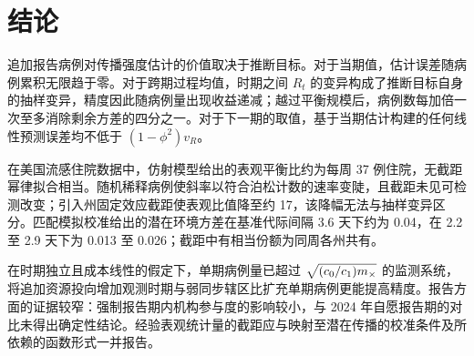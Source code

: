 \section{结论}
\label{sec:conclusion}

追加报告病例对传播强度估计的价值取决于推断目标。对于当期值，估计误差随病例累积无限趋于零。对于跨期过程均值，时期之间 $R_t$ 的变异构成了推断目标自身的抽样变异，精度因此随病例量出现收益递减；越过平衡规模后，病例数每加倍一次至多消除剩余方差的四分之一。对于下一期的取值，基于当期估计构建的任何线性预测误差均不低于 $(1-\phi^2)v_R$。

在美国流感住院数据中，仿射模型给出的表观平衡比约为每周 37 例住院，无截距幂律拟合相当。随机稀释病例使斜率以符合泊松计数的速率变陡，且截距未见可检测改变；引入州固定效应截距使表观比值降至约 17，该降幅无法与抽样变异区分。匹配模拟校准给出的潜在环境方差在基准代际间隔 3.6 天下约为 0.04，在 2.2 至 2.9 天下为 0.013 至 0.026；截距中有相当份额为同周各州共有。

在时期独立且成本线性的假定下，单期病例量已超过 $\sqrt{(c_0/c_1)m_{\times}}$ 的监测系统，将追加资源投向增加观测时期与弱同步辖区比扩充单期病例更能提高精度。报告方面的证据较窄：强制报告期内机构参与度的影响较小，与 2024 年自愿报告期的对比未得出确定性结论。经验表观统计量的截距应与映射至潜在传播的校准条件及所依赖的函数形式一并报告。
